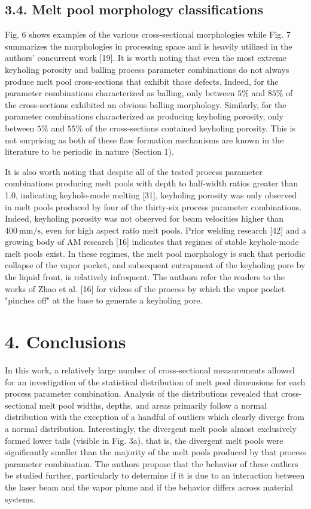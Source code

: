 \documentclass[10pt]{article}
\begin{document}
\subsection*{3.4. Melt pool morphology classifications}
Fig. 6 shows examples of the various cross-sectional morphologies while Fig. 7 summarizes the morphologies in processing space and is heavily utilized in the authors' concurrent work [19]. It is worth noting that even the most extreme keyholing porosity and balling process parameter combinations do not always produce melt pool cross-sections that exhibit those defects. Indeed, for the parameter combinations characterized as balling, only between $5 \%$ and $85 \%$ of the cross-sections exhibited an obvious balling morphology. Similarly, for the parameter combinations characterized as producing keyholing porosity, only between $5 \%$ and $55 \%$ of the cross-sections contained keyholing porosity. This is not surprising as both of these flaw formation mechanisms are known in the literature to be periodic in nature (Section 1).

It is also worth noting that despite all of the tested process parameter combinations producing melt pools with depth to half-width ratios greater than 1.0, indicating keyhole-mode melting [31], keyholing porosity was only observed in melt pools produced by four of the thirty-six process parameter combinations. Indeed, keyholing porosity was not observed for beam velocities higher than $400 \mathrm{~mm} / \mathrm{s}$, even for high aspect ratio melt pools. Prior welding research [42] and a growing body of AM research [16] indicates that regimes of stable keyhole-mode melt pools exist. In these regimes, the melt pool morphology is such that periodic collapse of the vapor pocket, and subsequent entrapment of the keyholing pore by the liquid front, is relatively infrequent. The authors refer the readers to the works of Zhao et al. [16] for videos of the process by which the vapor pocket "pinches off" at the base to generate a keyholing pore.

\section*{4. Conclusions}
In this work, a relatively large number of cross-sectional measurements allowed for an investigation of the statistical distribution of melt pool dimensions for each process parameter combination. Analysis of the distributions revealed that cross-sectional melt pool widths, depths, and areas primarily follow a normal distribution with the exception of a handful of outliers which clearly diverge from a normal distribution. Interestingly, the divergent melt pools almost exclusively formed lower tails (visible in Fig. 3a), that is, the divergent melt pools were significantly smaller than the majority of the melt pools produced by that process parameter combination. The authors propose that the behavior of these outliers be studied further, particularly to determine if it is due to an interaction between the laser beam and the vapor plume and if the behavior differs across material systems.
\end{document}
